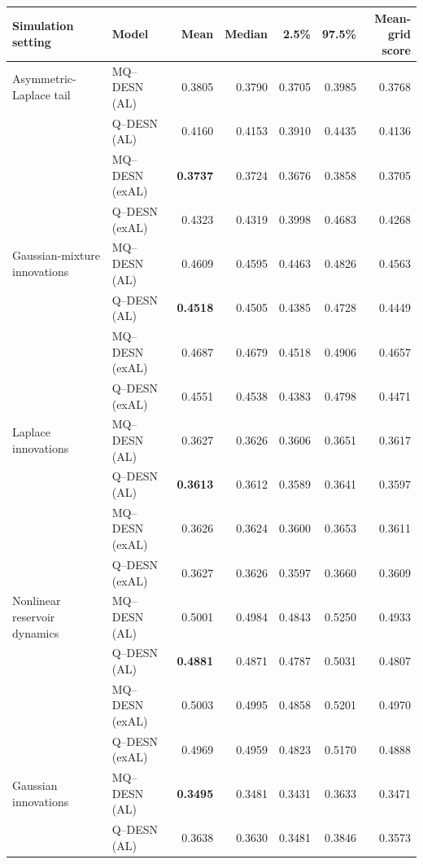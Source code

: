 \begin{table}[p]
\centering
\footnotesize
\setlength{\tabcolsep}{3pt}
\renewcommand{\arraystretch}{1.08}
\begin{tabular}{@{}>{\raggedright\arraybackslash}p{}>{\raggedright\arraybackslash}p{}rrrrr@{}}
\toprule
Simulation setting & Model & Mean & Median & 2.5\% & 97.5\% & \shortstack{Mean-grid\\score} \\
\midrule
Asymmetric-Laplace tail & MQ--DESN (AL) & 0.3805 & 0.3790 & 0.3705 & 0.3985 & 0.3768 \\
 & Q--DESN (AL) & 0.4160 & 0.4153 & 0.3910 & 0.4435 & 0.4136 \\
 & MQ--DESN (exAL) & \textbf{0.3737} & 0.3724 & 0.3676 & 0.3858 & 0.3705 \\
 & Q--DESN (exAL) & 0.4323 & 0.4319 & 0.3998 & 0.4683 & 0.4268 \\
\addlinespace[2pt]
Gaussian-mixture innovations & MQ--DESN (AL) & 0.4609 & 0.4595 & 0.4463 & 0.4826 & 0.4563 \\
 & Q--DESN (AL) & \textbf{0.4518} & 0.4505 & 0.4385 & 0.4728 & 0.4449 \\
 & MQ--DESN (exAL) & 0.4687 & 0.4679 & 0.4518 & 0.4906 & 0.4657 \\
 & Q--DESN (exAL) & 0.4551 & 0.4538 & 0.4383 & 0.4798 & 0.4471 \\
\addlinespace[2pt]
Laplace innovations & MQ--DESN (AL) & 0.3627 & 0.3626 & 0.3606 & 0.3651 & 0.3617 \\
 & Q--DESN (AL) & \textbf{0.3613} & 0.3612 & 0.3589 & 0.3641 & 0.3597 \\
 & MQ--DESN (exAL) & 0.3626 & 0.3624 & 0.3600 & 0.3653 & 0.3611 \\
 & Q--DESN (exAL) & 0.3627 & 0.3626 & 0.3597 & 0.3660 & 0.3609 \\
\addlinespace[2pt]
Nonlinear reservoir dynamics & MQ--DESN (AL) & 0.5001 & 0.4984 & 0.4843 & 0.5250 & 0.4933 \\
 & Q--DESN (AL) & \textbf{0.4881} & 0.4871 & 0.4787 & 0.5031 & 0.4807 \\
 & MQ--DESN (exAL) & 0.5003 & 0.4995 & 0.4858 & 0.5201 & 0.4970 \\
 & Q--DESN (exAL) & 0.4969 & 0.4959 & 0.4823 & 0.5170 & 0.4888 \\
\addlinespace[2pt]
Gaussian innovations & MQ--DESN (AL) & \textbf{0.3495} & 0.3481 & 0.3431 & 0.3633 & 0.3471 \\
 & Q--DESN (AL) & 0.3638 & 0.3630 & 0.3481 & 0.3846 & 0.3573 \\

\end{tabular}
\end{table}
